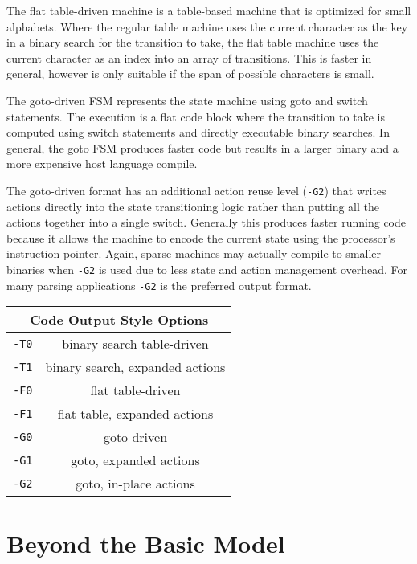 \documentclass[letterpaper,11pt,oneside]{book}
\newcommand{\verbspace}{\vspace{10pt}}
\begin{document}
The flat table-driven machine is a table-based machine that is optimized for
small alphabets. Where the regular table machine uses the current character as
the key in a binary search for the transition to take, the flat table machine
uses the current character as an index into an array of transitions. This is
faster in general, however is only suitable if the span of possible characters
is small.

The goto-driven FSM represents the state machine using goto and switch
statements. The execution is a flat code block where the transition to take is
computed using switch statements and directly executable binary searches.  In
general, the goto FSM produces faster code but results in a larger binary and a
more expensive host language compile.

The goto-driven format has an additional action reuse level (\verb|-G2|) that
writes actions directly into the state transitioning logic rather than putting
all the actions together into a single switch. Generally this produces faster
running code because it allows the machine to encode the current state using
the processor's instruction pointer. Again, sparse machines may actually
compile to smaller binaries when \verb|-G2| is used due to less state and
action management overhead. For many parsing applications \verb|-G2| is the
preferred output format.

\verbspace
\begin{center}
\begin{tabular}{|c|c|}
\hline
\multicolumn{2}{|c|}{\bf Code Output Style Options} \\
\hline
\verb|-T0|&binary search table-driven\\
\hline
\verb|-T1|&binary search, expanded actions\\
\hline
\verb|-F0|&flat table-driven\\
\hline
\verb|-F1|&flat table, expanded actions\\
\hline
\verb|-G0|&goto-driven\\
\hline
\verb|-G1|&goto, expanded actions\\
\hline
\verb|-G2|&goto, in-place actions\\
\hline
\end{tabular}
\end{center}

\chapter{Beyond the Basic Model}
\end{document}
